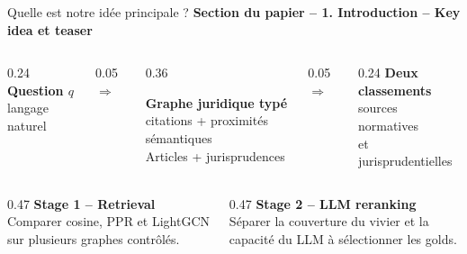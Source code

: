 \documentclass[aspectratio=169,10pt]{beamer}
\newcommand{\papersection}[1]{%
  {\scriptsize\textcolor{accent}{\textbf{Section du papier -- #1}}}\par\vspace{0.55em}}
\begin{document}
\begin{frame}{Quelle est notre idée principale ?}
  \papersection{1. Introduction -- Key idea et teaser}
  \footnotesize
  \begin{columns}[c,onlytextwidth]
    \begin{column}{0.24\textwidth}
      \centering\textbf{Question $q$}\\[0.4em]
      \small langage naturel
    \end{column}
    \begin{column}{0.05\textwidth}\centering$\Longrightarrow$\end{column}
    \begin{column}{0.36\textwidth}
      \centering
      \colorbox{accentsoft}{\parbox{0.92\linewidth}{\centering\vspace{0.8em}
      \textbf{Graphe juridique typé}\\[0.35em]
      citations + proximités sémantiques\\
      Articles + jurisprudences
      \vspace{0.8em}}}
    \end{column}
    \begin{column}{0.05\textwidth}\centering$\Longrightarrow$\end{column}
    \begin{column}{0.24\textwidth}
      \centering\textbf{Deux classements}\\[0.4em]
      \small sources normatives\\et jurisprudentielles
    \end{column}
  \end{columns}

  \vspace{0.9em}
  \begin{columns}[T,onlytextwidth]
    \begin{column}{0.47\textwidth}
      \textbf{Stage 1 -- Retrieval}\\
      Comparer cosine, PPR et LightGCN sur plusieurs graphes contrôlés.
    \end{column}
    \begin{column}{0.47\textwidth}
      \textbf{Stage 2 -- LLM reranking}\\
      Séparer la couverture du vivier et la capacité du LLM à sélectionner les golds.
    \end{column}
  \end{columns}
\end{frame}
\end{document}
